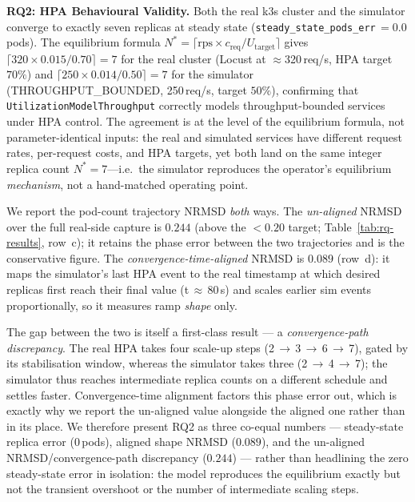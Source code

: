 \documentclass[ASNA,twocolumn]{USG}
\begin{document}
    \textbf{RQ2: HPA Behavioural Validity.}
    Both the real k3s cluster and the simulator converge to exactly
    seven replicas at steady state
    (\texttt{steady\_state\_pods\_err}\,$= 0.0$\,pods). The equilibrium
    formula $N^{*} = \lceil \mathrm{rps} \times c_{\text{req}} /
    U_{\text{target}} \rceil$ gives $\lceil 320 \times 0.015 / 0.70
    \rceil = 7$ for the real cluster (Locust at $\approx$320\,req/s, HPA
    target $70\%$) and $\lceil 250 \times 0.014 / 0.50 \rceil = 7$ for
    the simulator (THROUGHPUT\_BOUNDED, 250\,req/s, target $50\%$),
    confirming that \texttt{UtilizationModelThroughput} correctly models
    throughput-bounded services under HPA control. The agreement is at the
    level of the equilibrium formula, not parameter-identical inputs: the
    real and simulated services have different request rates, per-request
    costs, and HPA targets, yet both land on the same integer replica count
    $N^{*}=7$---i.e.\ the simulator reproduces the operator's equilibrium
    \emph{mechanism}, not a hand-matched operating point.

    We report the pod-count trajectory NRMSD \emph{both} ways. The
    \emph{un-aligned} NRMSD over the full real-side capture is $0.244$
    (above the $<0.20$ target; Table~\ref{tab:rq-results}, row~c); it
    retains the phase error between the two trajectories and is the
    conservative figure. The \emph{convergence-time-aligned} NRMSD is
    $0.089$ (row~d): it maps the simulator's last HPA event to the real
    timestamp at which desired replicas first reach their final value
    (t\,$\approx$\,80\,s) and scales earlier sim events proportionally,
    so it measures ramp \emph{shape} only.

    The gap between the two is itself a first-class result --- a
    \emph{convergence-path discrepancy}. The real HPA takes four scale-up
    steps (2\,$\to$\,3\,$\to$\,6\,$\to$\,7), gated by its stabilisation
    window, whereas the simulator takes three (2\,$\to$\,4\,$\to$\,7); the
    simulator thus reaches intermediate replica counts on a different
    schedule and settles faster. Convergence-time alignment factors this
    phase error out, which is exactly why we report the un-aligned value
    alongside the aligned one rather than in its place. We therefore
    present RQ2 as three co-equal numbers --- steady-state replica error
    ($0$\,pods), aligned shape NRMSD ($0.089$), and the un-aligned
    NRMSD/convergence-path discrepancy ($0.244$) --- rather than headlining
    the zero steady-state error in isolation: the model reproduces the
    equilibrium exactly but not the transient overshoot or the number of
    intermediate scaling steps.
\end{document}
